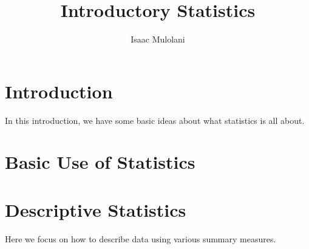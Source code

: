 \documentclass{ximera}
\title{Introductory Statistics}
\author{Isaac Mulolani}
\begin{document}
\maketitle

\section{Introduction}

In this introduction, we have some basic ideas about what statistics is all about.

\section{Basic Use of Statistics}


\section{Descriptive Statistics}

Here we focus on how to describe data using various summary measures.
\end{document}
